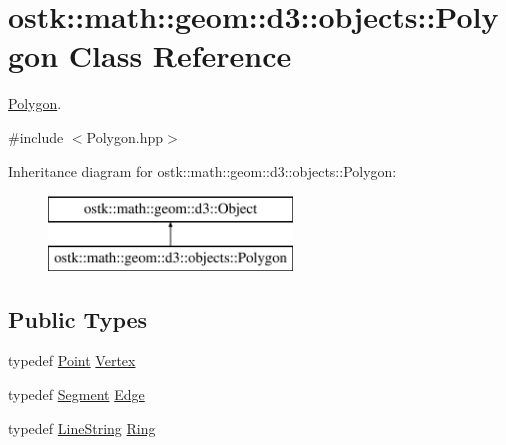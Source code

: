 \hypertarget{classostk_1_1math_1_1geom_1_1d3_1_1objects_1_1_polygon}{}\section{ostk\+:\+:math\+:\+:geom\+:\+:d3\+:\+:objects\+:\+:Polygon Class Reference}
\label{classostk_1_1math_1_1geom_1_1d3_1_1objects_1_1_polygon}


\hyperlink{classostk_1_1math_1_1geom_1_1d3_1_1objects_1_1_polygon}{Polygon}.  




{\ttfamily \#include $<$Polygon.\+hpp$>$}

Inheritance diagram for ostk\+:\+:math\+:\+:geom\+:\+:d3\+:\+:objects\+:\+:Polygon\+:\begin{figure}[H]
\begin{center}
\leavevmode
\includegraphics[height=2.000000cm]{classostk_1_1math_1_1geom_1_1d3_1_1objects_1_1_polygon}
\end{center}
\end{figure}
\subsection*{Public Types}
\begin{DoxyCompactItemize}
\item 
typedef \hyperlink{classostk_1_1math_1_1geom_1_1d3_1_1objects_1_1_point}{Point} \hyperlink{classostk_1_1math_1_1geom_1_1d3_1_1objects_1_1_polygon_a314eaf277355d59f5e6ab775702c47c2}{Vertex}
\item 
typedef \hyperlink{classostk_1_1math_1_1geom_1_1d3_1_1objects_1_1_segment}{Segment} \hyperlink{classostk_1_1math_1_1geom_1_1d3_1_1objects_1_1_polygon_a58c9a7e93e903b2226804116cce4f1ec}{Edge}
\item 
typedef \hyperlink{classostk_1_1math_1_1geom_1_1d3_1_1objects_1_1_line_string}{Line\+String} \hyperlink{classostk_1_1math_1_1geom_1_1d3_1_1objects_1_1_polygon_a5c06c7fb605535e012b1f362ed3a38c6}{Ring}
\end{DoxyCompactItemize}
